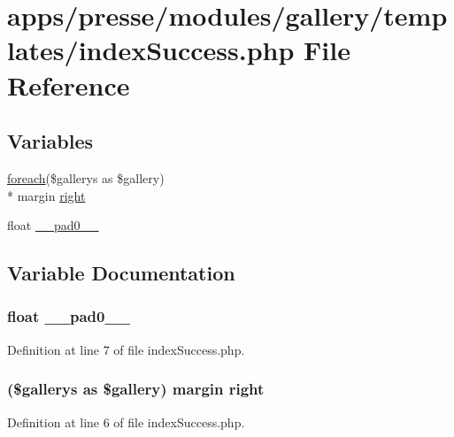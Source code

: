 \hypertarget{presse_2modules_2gallery_2templates_2index_success_8php}{\section{apps/presse/modules/gallery/templates/index\-Success.php File Reference}
\label{presse_2modules_2gallery_2templates_2index_success_8php}
}
\subsection*{Variables}
\begin{DoxyCompactItemize}
\item 
\hyperlink{presse_2modules_2news_2templates_2index_success_8php_abc56db52b2e9a59bcd5c9e45ac5cb332}{foreach}(\$gallerys as \$gallery) \\*
margin \hyperlink{presse_2modules_2gallery_2templates_2index_success_8php_a14640e171e2fc91ea321b629ebc692ae}{right}
\item 
float \hyperlink{presse_2modules_2gallery_2templates_2index_success_8php_aa1230abe69f4cf7cb1115745f250d68d}{\-\_\-\-\_\-pad0\-\_\-\-\_\-}
\end{DoxyCompactItemize}


\subsection{Variable Documentation}
\hypertarget{presse_2modules_2gallery_2templates_2index_success_8php_aa1230abe69f4cf7cb1115745f250d68d}{
\subsubsection[{\-\_\-\-\_\-pad0\-\_\-\-\_\-}]{\setlength{\rightskip}{0pt plus 5cm}float \-\_\-\-\_\-pad0\-\_\-\-\_\-}}\label{presse_2modules_2gallery_2templates_2index_success_8php_aa1230abe69f4cf7cb1115745f250d68d}


Definition at line 7 of file index\-Success.\-php.

\hypertarget{presse_2modules_2gallery_2templates_2index_success_8php_a14640e171e2fc91ea321b629ebc692ae}{
\subsubsection[{right}]{ (\$gallerys as \$gallery) margin right}}\label{presse_2modules_2gallery_2templates_2index_success_8php_a14640e171e2fc91ea321b629ebc692ae}


Definition at line 6 of file index\-Success.\-php.

